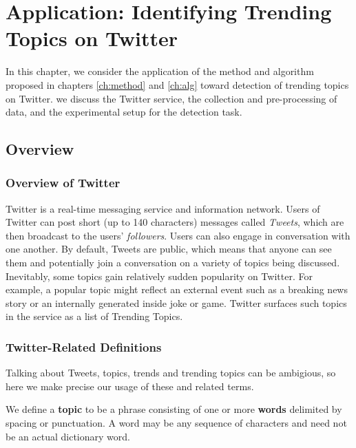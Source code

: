 \chapter{Application: Identifying Trending Topics on Twitter}
\label{ch:data}


In this chapter, we consider the application of the method and algorithm proposed
in chapters \ref{ch:method} and \ref{ch:alg} toward detection of trending topics
on Twitter. we discuss the Twitter service, the collection and pre-processing of
data, and the experimental setup for the detection task.

\section{Overview}
\subsection{Overview of Twitter}
Twitter is a real-time messaging service and information network. Users of
Twitter can post short (up to 140 characters) messages called {\em Tweets},
which are then broadcast to the users' {\em followers}. Users can also engage in
conversation with one another. By default, Tweets are public, which means that
anyone can see them and potentially join a conversation on a variety of topics
being discussed. Inevitably, some topics gain relatively sudden popularity on
Twitter. For example, a popular topic might reflect an external event such as a
breaking news story or an internally generated inside joke or game. Twitter
surfaces such topics in the service as a list of Trending Topics. 

\subsection{Twitter-Related Definitions}
Talking about Tweets, topics, trends and trending topics can be ambigious, so
here we make precise our usage of these and related terms.

\begin{defn}[Topic]
  We define a {\bf topic} to be a phrase consisting of one or more {\bf words}
  delimited by spacing or punctuation. A word may be any sequence of characters
  and need not be an actual dictionary word.
\end{defn}

